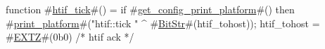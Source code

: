 function #\hyperref[sailRISCVzhtifzytick]{htif\_tick}#() = {
  if   #\hyperref[sailRISCVzgetzyconfigzyprintzyplatform]{get\_config\_print\_platform}#()
  then #\hyperref[sailRISCVzprintzyplatform]{print\_platform}#("htif::tick " ^ #\hyperref[sailRISCVzBitStr]{BitStr}#(htif_tohost));
  htif_tohost = #\hyperref[sailRISCVzEXTZ]{EXTZ}#(0b0)  /* htif ack */
}
